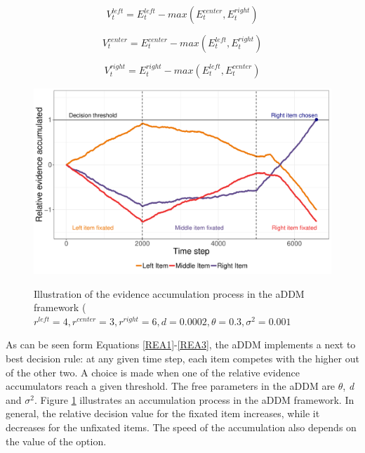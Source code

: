 \documentclass[11pt,a4paper]{article}
\begin{document}
\begin{equation} \label{REA1}
V_{t}^{left}=E_{t}^{left}-max(E_{t}^{center},E_{t}^{right})
\end{equation}

\begin{equation} \label{REA2}
V_{t}^{center}=E_{t}^{center}-max(E_{t}^{left},E_{t}^{right})
\end{equation}


\begin{equation} \label{REA3}
V_{t}^{right}=E_{t}^{right}-max(E_{t}^{left},E_{t}^{center})
\end{equation}

\begin{figure}
\captionsetup{justification=centering}
\caption{Illustration of the evidence accumulation process in the aDDM framework
($\mathit{\mathit{r^{left}=4, r^{center}=3, r^{right}=6, d=0.0002}, \theta=0.3, \sigma^{2}=0.001}$}
\includegraphics[width=1\textwidth]{c1_driftrates.pdf}
\label{fig:driftrates}
\end{figure}
As can be seen form Equations \ref{REA1}-\ref{REA3}, the aDDM implements a next to best decision rule: at any given time step, each item competes with the higher out of the other two. A choice is made when one of the relative evidence accumulators reach a given threshold. The free parameters in the aDDM are $\theta$, \textit{d} and $\sigma^{2}$. Figure \ref{fig:driftrates} illustrates an accumulation process in the aDDM framework. In general, the relative decision value for the fixated item increases, while it decreases for the unfixated items. The speed of the accumulation also depends on the value of the option. 
\end{document}
